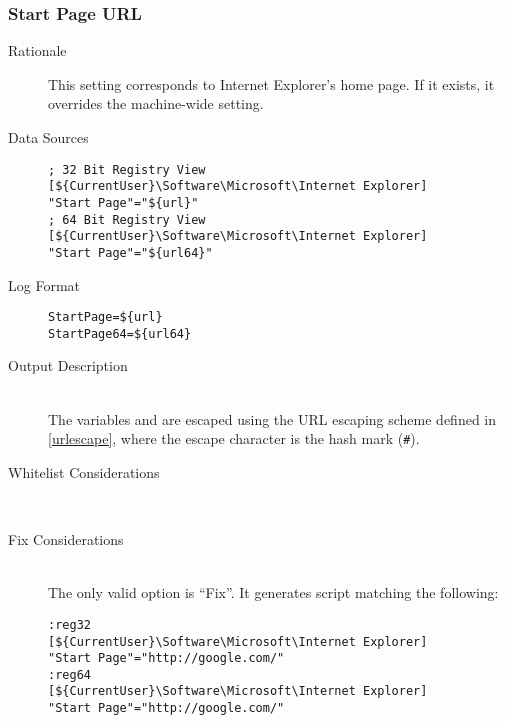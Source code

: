 \subsubsection{Start Page URL}
\begin{description}
\item[Rationale] This setting corresponds to Internet Explorer's home page. If
it exists, it overrides the machine-wide setting.

\item[Data Sources] \hfill
\vspace{-\baselineskip}
\begin{verbatim}
; 32 Bit Registry View
[${CurrentUser}\Software\Microsoft\Internet Explorer]
"Start Page"="${url}"
; 64 Bit Registry View
[${CurrentUser}\Software\Microsoft\Internet Explorer]
"Start Page"="${url64}"
\end{verbatim}
\item[Log Format] \hfill
\vspace{-\baselineskip}
\begin{verbatim} 
StartPage=${url}
StartPage64=${url64}
\end{verbatim}
\item[Output Description] \hfill \\
The variables  and  are escaped using the URL escaping
scheme defined in \ref{urlescape}, where the escape character is the hash mark
(\verb|#|).
\item[Whitelist Considerations] \hfill \\

\item[Fix Considerations] \hfill \\
The only valid option is ``Fix''. It generates script matching the following:
\vspace{-\baselineskip}
\begin{verbatim}
:reg32
[${CurrentUser}\Software\Microsoft\Internet Explorer]
"Start Page"="http://google.com/"
:reg64
[${CurrentUser}\Software\Microsoft\Internet Explorer]
"Start Page"="http://google.com/"
\end{verbatim}
\end{description}


